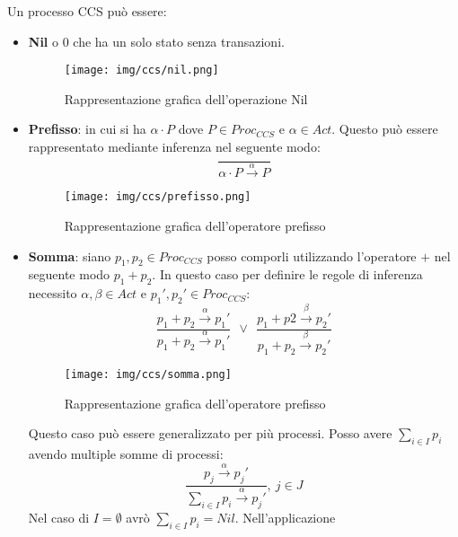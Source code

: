 Un processo CCS può essere:
\begin{itemize}
    \item \textbf{Nil} o 0 che ha un solo stato senza transazioni.
          \begin{figure}[!ht]
              \centering
              \texttt{[image: img/ccs/nil.png]}
              \caption{Rappresentazione grafica dell'operazione Nil}
          \end{figure}
    \item \textbf{Prefisso}: in cui si ha $\alpha \cdot P$ dove $P \in Proc_{CCS}$
          e $\alpha \in Act$. Questo può essere rappresentato mediante inferenza nel
          seguente modo:
          \begin{equation}
              \frac{}{\alpha \cdot P \xrightarrow{\alpha} P}
          \end{equation}
          \begin{figure}[!ht]
              \centering
              \texttt{[image: img/ccs/prefisso.png]}
              \caption{Rappresentazione grafica dell'operatore prefisso}
          \end{figure}
    \item \textbf{Somma}: siano $p_1, p_2 \in Proc_{CCS}$ posso comporli utilizzando
          l'operatore $+$ nel seguente modo $p_1 + p_2$. In questo caso per definire
          le regole di inferenza necessito $\alpha, \beta \in Act$ e $p_1', p_2' \in Proc_{CCS}$:
          \begin{equation}
              \frac{p_1 + p_2 \xrightarrow{\alpha} p_1'}{p_1 + p_2 \xrightarrow{\alpha} p_1'}
              \ \ \lor \ \
              \frac{p_1 + p2 \xrightarrow{\beta} p_2'}{p_1 + p_2 \xrightarrow{\beta} p_2'}
          \end{equation}
          \begin{figure}[!ht]
              \centering
              \texttt{[image: img/ccs/somma.png]}
              \caption{Rappresentazione grafica dell'operatore prefisso}
          \end{figure}
          Questo caso può essere generalizzato per più processi. Posso avere
          $\sum_{i \in I} p_i$ avendo multiple somme di processi:
          \begin{equation}
              \frac{p_j \xrightarrow{\alpha} p_j'}{\sum_{i \in I} p_i \xrightarrow{\alpha} p_j'}, \ j \in J
          \end{equation}
          Nel caso di $I = \emptyset$ avrò $\sum_{i \in I} p_i = Nil$. Nell'applicazione

\end{itemize}
